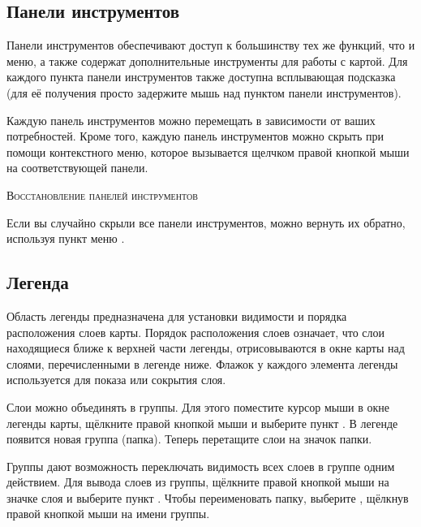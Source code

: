 
\subsection{Панели инструментов}\label{label_toolbars}

Панели инструментов обеспечивают доступ к большинству тех же функций,
что и меню, а также содержат дополнительные инструменты для работы с
картой. Для каждого пункта панели инструментов также доступна всплывающая
подсказка (для её получения просто задержите мышь над пунктом панели инструментов).

Каждую панель инструментов можно перемещать в зависимости от ваших
потребностей. Кроме того, каждую панель инструментов можно скрыть при
помощи контекстного меню, которое вызывается щелчком правой кнопкой мыши
на соответствующей панели.

\begin{Tip}
\caption{\textsc{Восстановление панелей инструментов}} 
Если вы случайно скрыли все панели инструментов, можно вернуть их обратно,
используя пункт меню  \arrow {}.
\end{Tip}

\subsection{Легенда}\label{label_legend}

Область легенды предназначена для установки видимости и порядка
расположения слоев карты. Порядок расположения слоев означает, что слои
находящиеся ближе к верхней части легенды, отрисовываются в окне карты
над слоями, перечисленными в легенде ниже. Флажок у каждого элемента
легенды используется для показа или сокрытия слоя.

Слои можно объединять в группы. Для этого поместите курсор мыши в окне
легенды карты, щёлкните правой кнопкой мыши и выберите пункт
. В легенде появится новая группа (папка).
Теперь перетащите слои на значок папки.

Группы дают возможность переключать видимость всех слоев в группе одним действием.
Для вывода слоев из группы, щёлкните правой кнопкой мыши на значке слоя и выберите
пункт . Чтобы переименовать
папку, выберите , щёлкнув правой кнопкой мыши на
имени группы.


